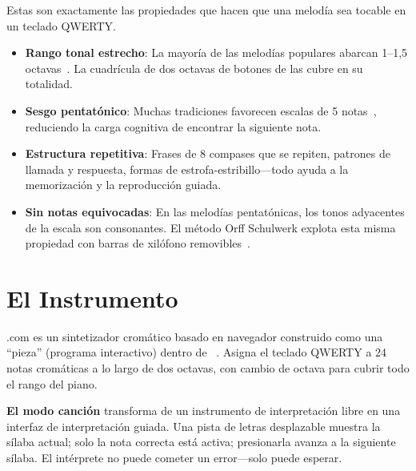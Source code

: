 \documentclass[11pt]{article}
\begin{document}
\vspace{0.3em}

Estas son exactamente las propiedades que hacen que una melodía sea tocable en un teclado QWERTY.

\begin{card}
\begin{itemize}
  \item \textbf{Rango tonal estrecho}: La mayoría de las melodías populares abarcan 1--1,5 octavas~\citep{lomax1968folk}. La cuadrícula de dos octavas de botones de \np{} las cubre en su totalidad.
  \item \textbf{Sesgo pentatónico}: Muchas tradiciones favorecen escalas de 5 notas~\citep{kodaly1971folk}, reduciendo la carga cognitiva de encontrar la siguiente nota.
  \item \textbf{Estructura repetitiva}: Frases de 8 compases que se repiten, patrones de llamada y respuesta, formas de estrofa-estribillo---todo ayuda a la memorización y la reproducción guiada.
  \item \textbf{Sin notas equivocadas}: En las melodías pentatónicas, los tonos adyacentes de la escala son consonantes. El método Orff Schulwerk explota esta misma propiedad con barras de xilófono removibles~\citep{orff1978schulwerk}.
\end{itemize}
\end{card}

\section{El Instrumento}

\np{}.com es un sintetizador cromático basado en navegador construido como una ``pieza'' (programa interactivo) dentro de \ac{}~\citep{scudder2026ac, scudder2026notepat}. Asigna el teclado QWERTY a 24 notas cromáticas a lo largo de dos octavas, con cambio de octava para cubrir todo el rango del piano.

\begin{darkcard}
\textbf{El modo canción} transforma \np{} de un instrumento de interpretación libre en una interfaz de interpretación guiada. Una pista de letras desplazable muestra la sílaba actual; solo la nota correcta está activa; presionarla avanza a la siguiente sílaba. El intérprete no puede cometer un error---solo puede esperar.
\end{darkcard}
\end{document}
